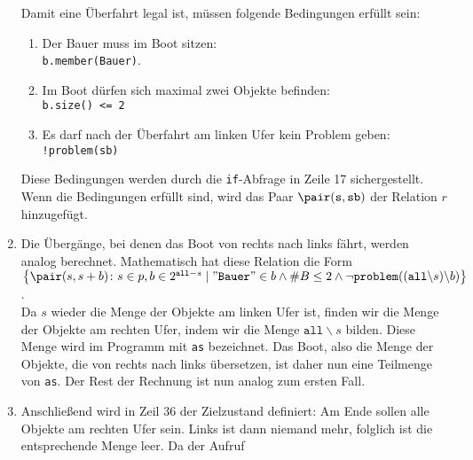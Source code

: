 \begin{enumerate}
      Damit eine Überfahrt legal ist, m\"ussen folgende Bedingungen erf\"ullt sein:
      \begin{enumerate}
      \item Der Bauer muss im Boot sitzen: 
            \\[0.2cm]
            \hspace*{1.3cm}
            \texttt{b.member(Bauer)}.
      \item Im Boot d\"urfen sich maximal zwei Objekte befinden:
            \\[0.2cm]
            \hspace*{1.3cm}
            \texttt{b.size() <= 2}
      \item Es darf nach der Überfahrt am linken Ufer kein Problem geben:
            \\[0.2cm]
            \hspace*{1.3cm}
            \texttt{!problem(sb)}
      \end{enumerate}
      Diese Bedingungen werden durch die \texttt{if}-Abfrage in Zeile 17 sichergestellt.
      Wenn die Bedingungen erf\"ullt sind, wird das Paar $\pair(\mathtt{s}, \mathtt{sb})$
      der Relation $r$ hinzugef\"ugt.
\item Die Überg\"ange, bei denen das Boot von rechts nach links f\"ahrt, werden analog
      berechnet.  Mathematisch hat diese Relation die Form
      \\[0.2cm]
      \hspace*{1.3cm}
      $\bigl\{ \pair(s, s + b) \colon s \in p, b \in 2^{\mathtt{all} - s} \mid
              \mathtt{\symbol{34}Bauer\symbol{34}} \in b \wedge \#B \leq 2 \wedge \neg
              \mathtt{problem}((\mathtt{all} \backslash s) \backslash b) 
       \bigr\}
      $.
      \\[0.2cm]
      Da $s$ wieder die Menge der Objekte am linken Ufer ist, finden wir die Menge der Objekte
      am rechten Ufer, indem wir die Menge $\mathtt{all} \backslash s$ bilden.  Diese
      Menge wird im Programm mit \texttt{as} bezeichnet.  Das Boot, also die Menge der
      Objekte, die von rechts nach links \"ubersetzen, ist daher nun eine Teilmenge von \texttt{as}.
      Der Rest der Rechnung ist nun analog zum ersten Fall.
\item Anschlie{\ss}end wird in Zeil 36 der Zielzustand definiert:
      Am Ende sollen alle Objekte am rechten Ufer sein.  Links ist dann niemand mehr,
      folglich ist die entsprechende Menge leer.  Da der Aufruf
      \\[0.2cm]

\end{enumerate}
